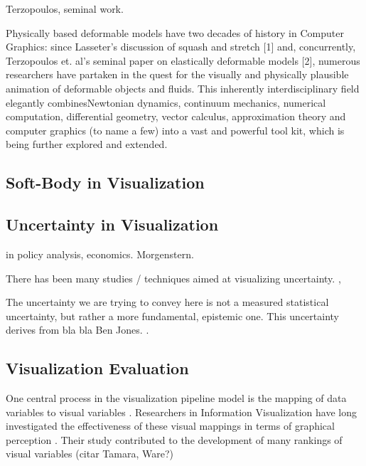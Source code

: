 \documentclass[manuscript, screen]{timtm}
\begin{document}
Terzopoulos, seminal work.

Physically based deformable models have two decades of history
in Computer Graphics: since Lasseter’s discussion of
squash and stretch [1] and, concurrently, Terzopoulos et. al’s
seminal paper on elastically deformable models [2], numerous
researchers have partaken in the quest for the visually
and physically plausible animation of deformable objects and
fluids. This inherently interdisciplinary field elegantly combinesNewtonian
dynamics, continuum mechanics, numerical
computation, differential geometry, vector calculus, approximation
theory and computer graphics (to name a few) into
a vast and powerful tool kit, which is being further explored
and extended.\cite{NealenAndrew2006PBDM}


\subsection{Soft-Body in Visualization}



\subsection{Uncertainty in Visualization}

in policy analysis, economics. Morgenstern.

There has been many studies / techniques aimed at visualizing uncertainty. \cite{Padilla-uncertainty-chapter}, \cite{HullmanJessica2019IPoE}




The uncertainty we are trying to convey here is not a measured statistical uncertainty, but rather a more fundamental, epistemic one. This uncertainty derives from bla bla Ben Jones. \cite{ben-jones-data-pitfalls}.


\subsection{Visualization Evaluation} \label{section:vis-eval}

One central process in the visualization pipeline model is the mapping of data variables to visual variables \cite{readings-infovis-shneiderman}. Researchers in Information Visualization have long investigated the effectiveness of these visual mappings in terms of graphical perception \cite{HeerJeffrey2010Cgpu-bostock-amazon-turk}. Their study contributed to the development of many rankings of visual variables (citar Tamara, Ware?)
\end{document}

